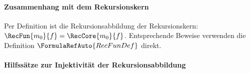 \documentclass[main.tex]{subfiles}
\begin{document}
\begin{tabproofwide}
\end{tabproofwide}
\paragraph{Zusammenhang mit dem Rekursionskern}

Per Definition ist die Rekursionsabbildung der Rekursionskern:
\(\RecFun{m_0}{f}=\RecCore{m_0}{f}\). Entsprechende Beweise verwenden die
Definition \(\FormulaRefAuto{RecFunDef}\) direkt.


\paragraph{Hilfssätze zur Injektivität der Rekursionsabbildung}
\end{document}
